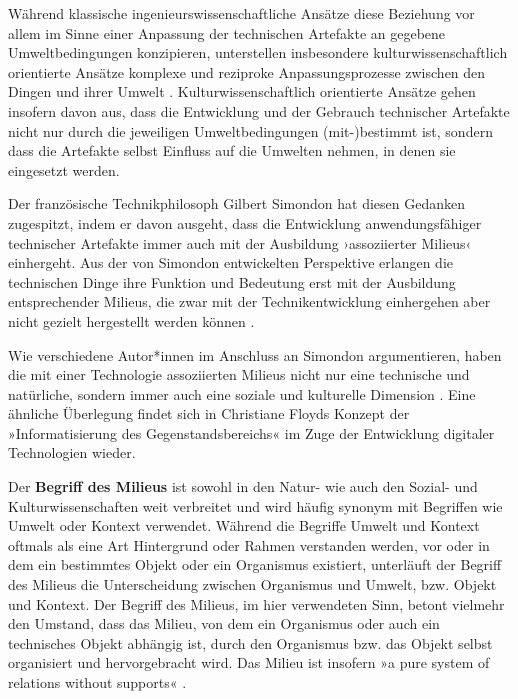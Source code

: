 \documentclass[
  a4paper,
]{book}
\begin{document}
Während klassische ingenieurswissenschaftliche Ansätze diese Beziehung vor allem im Sinne einer Anpassung der technischen Artefakte an gegebene Umweltbedingungen konzipieren, unterstellen insbesondere kulturwissenschaftlich orientierte Ansätze komplexe und reziproke Anpassungsprozesse zwischen den Dingen und ihrer Umwelt \citep[vgl. z.B.][]{akrichDescriptionTechnicalObject1992}. Kulturwissenschaftlich orientierte Ansätze gehen insofern davon aus, dass die Entwicklung und der Gebrauch technischer Artefakte nicht nur durch die jeweiligen Umweltbedingungen (mit-)bestimmt ist, sondern dass die Artefakte selbst Einfluss auf die Umwelten nehmen, in denen sie eingesetzt werden.

Der französische Technikphilosoph Gilbert Simondon hat diesen Gedanken zugespitzt, indem er davon ausgeht, dass die Entwicklung anwendungsfähiger technischer Artefakte immer auch mit der Ausbildung ›assoziierter Milieus‹ einhergeht. Aus der von Simondon entwickelten Perspektive erlangen die technischen Dinge ihre Funktion und Bedeutung erst mit der Ausbildung entsprechender Milieus, die zwar mit der Technikentwicklung einhergehen aber nicht gezielt hergestellt werden können \citep{simondonExistenzweiseTechnischerObjekte2012}.

Wie verschiedene Autor*innen im Anschluss an Simondon argumentieren, haben die mit einer Technologie assoziierten Milieus nicht nur eine technische und natürliche, sondern immer auch eine soziale und kulturelle Dimension \citep[vgl. z.B.][]{delitzGilbertSimondonsTheorie2012, hoelOntologicalForceTechnicity2013, huiWhatDigitalObject2012, mackenzieProblematisingTechnologicalObject2005}. Eine ähnliche Überlegung findet sich in Christiane Floyds Konzept der »Informatisierung des Gegenstandsbereichs« \citep[S. 245]{floydAutooperationaleFormUnd1997} im Zuge der Entwicklung digitaler Technologien wieder.

Der \textbf{Begriff des Milieus} ist sowohl in den Natur- wie auch den Sozial- und Kulturwissenschaften weit verbreitet und wird häufig synonym mit Begriffen wie Umwelt oder Kontext verwendet. Während die Begriffe Umwelt und Kontext oftmals als eine Art Hintergrund oder Rahmen verstanden werden, vor oder in dem ein bestimmtes Objekt oder ein Organismus existiert, unterläuft der Begriff des Milieus die Unterscheidung zwischen Organismus und Umwelt, bzw. Objekt und Kontext. Der Begriff des Milieus, im hier verwendeten Sinn, betont vielmehr den Umstand, dass das Milieu, von dem ein Organismus oder auch ein technisches Objekt abhängig ist, durch den Organismus bzw. das Objekt selbst organisiert und hervorgebracht wird. Das Milieu ist insofern »a pure system of relations without supports« \citep[S. 103]{canguilhemKnowledgeLife2008}.
\end{document}
